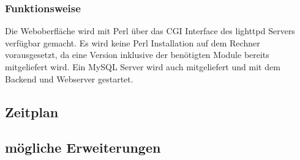 \documentclass[12pt,a4paper]{article}
\begin{document}
\subsubsection{Funktionsweise}

Die Weboberfläche wird mit Perl über das CGI Interface des lighttpd Servers verfügbar gemacht. Es wird keine Perl Installation auf dem Rechner vorausgesetzt, da eine Version inklusive der benötigten Module bereits mitgeliefert wird. Ein MySQL Server wird auch mitgeliefert und mit dem Backend und Webserver gestartet.


\subsection{Zeitplan}
\subsection{mögliche Erweiterungen}
\end{document}
